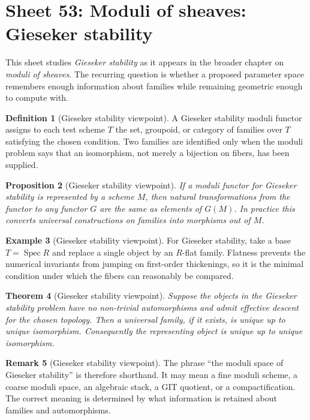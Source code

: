 \documentclass[11pt]{amsart}
\newtheorem{theorem}{Theorem}[section]
\newtheorem{proposition}[theorem]{Proposition}
\theoremstyle{definition}
\newtheorem{definition}[theorem]{Definition}
\newtheorem{example}[theorem]{Example}
\newtheorem{remark}[theorem]{Remark}
\newcommand{\Spec}{\operatorname{Spec}}
\begin{document}
\section{Sheet 53: Moduli of sheaves: Gieseker stability}
This sheet studies \emph{Gieseker stability} as it appears in the broader chapter on \emph{moduli of sheaves}.  The recurring question is whether a proposed parameter space remembers enough information about families while remaining geometric enough to compute with.
\begin{definition}[Gieseker stability viewpoint]
A Gieseker stability moduli functor assigns to each test scheme $T$ the set, groupoid, or category of families over $T$ satisfying the chosen condition.  Two families are identified only when the moduli problem says that an isomorphism, not merely a bijection on fibers, has been supplied.
\end{definition}
\begin{proposition}[Gieseker stability viewpoint]
If a moduli functor for Gieseker stability is represented by a scheme $M$, then natural transformations from the functor to any functor $G$ are the same as elements of $G(M)$.  In practice this converts universal constructions on families into morphisms out of $M$.
\end{proposition}
\begin{example}[Gieseker stability viewpoint]
For Gieseker stability, take a base $T=\Spec R$ and replace a single object by an $R$-flat family.  Flatness prevents the numerical invariants from jumping on first-order thickenings, so it is the minimal condition under which the fibers can reasonably be compared.
\end{example}
\begin{theorem}[Gieseker stability viewpoint]
Suppose the objects in the Gieseker stability problem have no non-trivial automorphisms and admit effective descent for the chosen topology.  Then a universal family, if it exists, is unique up to unique isomorphism.  Consequently the representing object is unique up to unique isomorphism.
\end{theorem}
\begin{remark}[Gieseker stability viewpoint]
The phrase ``the moduli space of Gieseker stability'' is therefore shorthand.  It may mean a fine moduli scheme, a coarse moduli space, an algebraic stack, a GIT quotient, or a compactification.  The correct meaning is determined by what information is retained about families and automorphisms.
\end{remark}
\end{document}
